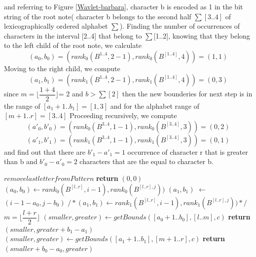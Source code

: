 \documentclass[11pt,a4paper]{report}
\begin{document}
and referring to Figure \ref{Wavlet-barbara}, character
b is encoded as 1 in the bit string of the root note( character b belongs 
to the second half $\sum[3..4]$ of lexicographically ordered 
alphabet $\sum$).
Finding the number of occurrences of characters 
in the interval [2..4] that belong to $\sum$[1..2], knowing that 
they belong to the left child of the root note, we calculate\\
$$(a_{0}, b_{0})=(rank_{0} ( B^{1..4} ,  2-1), rank_{0} (B^[1..4] , 4)) = (1 , 1) $$
Moving to the right child, we compute
$$(a_{1}, b_{1})=(rank_{1} ( B^{1..4} ,  2-1), rank_{1} (B^[1..4] , 4)) = (0 , 3) $$
since  $m=\lfloor \dfrac  {1+4}{2} \rfloor$= 2 and $b >\sum[2]$ then
the new bounderies for next step is in the range of $[a_{1}+1..b_{1}]
=[1,3]$ and for the alphabet range of $[m+1..r] = [3..4]$
Proceeding recursively, we compute
$$(a\prime_{0}, b\prime_{0})=(rank_{0} ( B^{3..4} ,  1-1), rank_{0} (B^[3..4] , 3)) = (0 , 2) $$
$$(a\prime_{1}, b\prime_{1})=(rank_{1} ( B^{3..4} ,  1-1), rank_{1} (B^[3..4] , 3)) = (0 , 1) $$
and find out that there are $b\prime_{1}-a\prime_{1}=1$ occurrence 
of character r that is greater than b and $b\prime_{0}-a\prime_{0}=2 $ 
characters that are the equal to character b.




	\begin{algorithm}[H]
   \caption{}
    \begin{algorithmic}[1] 
            	\State $remove last letter from Pattern$
            	\State \textbf{return} $(0,0)$
            \Else
        	     \State $(a_{0}, b_{0}) \leftarrow  rank_{0}( B^{[l..r]}, i-1), rank_{0}(B^{[l..r],j}))$
        		 \State $(a_{1}, b_{1})$ $\leftarrow$ $(i-1-a_{0}, j - b_{0}) $
        		 \State $/* (a_{1}, b_{1}) \leftarrow  rank_{1}( B^{[l..r]}, i-1), rank_{1}(B^{[l..r],j})) */$
        		 \State $m = \lfloor \dfrac  {l+r}{2} \rfloor$
        		 	\State $(smaller, greater) \leftarrow getBounds ([a_{0}+1..b_{0}],[l..m],c)$
        		 	\State \textbf{return} $(smaller, greater+b_{1}-a_{1})$
     	  		\Else 
     	  			\State $(smaller, greater) \leftarrow getBounds ([a_{1}+1..b_{1}],[m+1..r],c)$ 
     	  			\State \textbf{return} $(smaller + b_{0}-a_{0}, greater)$
     		   \EndIf
     	   \EndIf
     
    \EndFunction

	\end{algorithmic}
  \label{smaller-greater}	
\end{algorithm}
\end{document}
